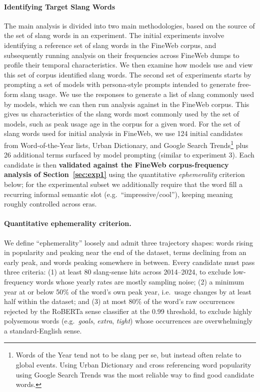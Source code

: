 \documentclass[11pt]{article}
\begin{document}
\paragraph{Identifying Target Slang Words}%
\label{sec:targets}

The main analysis is divided into two main methodologies, based on the source of the set of slang words in an experiment. The initial experiments involve identifying a reference set of slang words in the FineWeb corpus, and subsequently running analysis on their frequencies across FineWeb dumps to profile their temporal characteristics. We then examine how models use and view this set of corpus identified slang words. The second set of experiments starts by prompting a set of models with persona-style prompts intended to generate free-form slang usage. We use the responses to generate a list of slang commonly used by models, which we can then run analysis against in the FineWeb corpus. This gives us characteristics of the slang words most commonly used by the set of models, such as peak usage age in the corpus for a given word. 
For the set of slang words used for initial analysis in FineWeb, we use 124 initial candidates from Word-of-the-Year lists, Urban Dictionary, and Google Search Trends\footnote{Words of the Year tend not to be slang per se, but instead often relate to global events. Using Urban Dictionary and cross referencing word popularity using Google Search Trends was the most reliable way to find good candidate words.} plus 26 additional terms surfaced by model prompting (similar to experiment 3). Each candidate is then \textbf{validated against the FineWeb corpus-frequency analysis of Section~\ref{sec:exp1}} using the quantitative \textit{ephemerality} criterion below; for the experimental subset we additionally require that the word fill a recurring informal semantic slot (e.g.\ ``impressive/cool''), keeping meaning roughly controlled across eras.

\paragraph{Quantitative ephemerality criterion.}
We define ``ephemerality'' loosely and admit three trajectory shapes: words rising in popularity and peaking near the end of the dataset, terms declining from an early peak, and words peaking somewhere in between. Every candidate must pass three criteria: (1) at least 80 slang-sense hits across 2014--2024, to exclude low-frequency words whose yearly rates are mostly sampling noise; (2) a minimum year at or below 50\% of the word's own peak year, i.e.\ usage changes by at least half within the dataset; and (3) at most 80\% of the word's raw occurrences rejected by the RoBERTa sense classifier at the 0.99 threshold, to exclude highly polysemous words (e.g.\ \textit{goals}, \textit{extra}, \textit{tight}) whose occurrences are overwhelmingly a standard-English sense.
\end{document}
